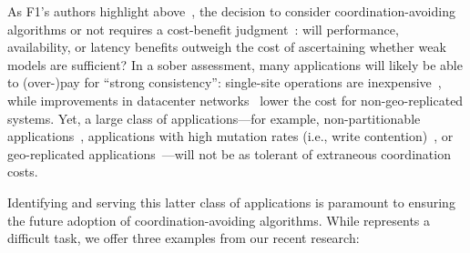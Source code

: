  As F1's authors highlight above~\cite{f1}, the decision to consider coordination-avoiding algorithms or not requires a cost-benefit judgment~\cite{queue}: will performance, availability, or latency benefits outweigh the cost of ascertaining whether weak models are sufficient? In a sober assessment, many applications will likely be able to (over-)pay for ``strong consistency'': single-site operations are inexpensive~\cite{sharednothing}, while improvements in datacenter networks~\cite{bobtail} lower the cost for non-geo-replicated systems. Yet, a large class of applications---for example, non-partitionable applications~\cite{tao}, applications with high mutation rates (i.e., write contention)~\cite{tpcc}, or geo-replicated applications~\cite{swift}---will not be as tolerant of extraneous coordination costs.

Identifying and serving this latter class of applications is paramount to ensuring the future adoption of coordination-avoiding algorithms. While represents a difficult task, we offer three examples from our recent research:

